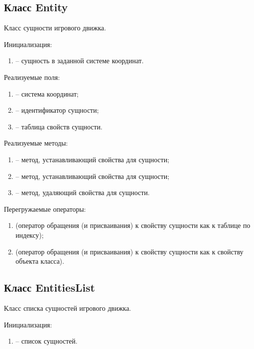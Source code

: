 \subsection{Класс Entity}
	\noindent Класс сущности игрового движка.

	\noindent Инициализация:
	\begin{enumerate}
		\item {} -- сущность в заданной системе координат.
	\end{enumerate}

	\noindent Реализуемые поля:
	\begin{enumerate}
		\item {} -- система координат;
		\item {} -- идентификатор сущности;
		\item {} -- таблица свойств сущности.
	\end{enumerate}

	\noindent Реализуемые методы:
	\begin{enumerate}
		\item {} -- метод, устанавливающий свойства для сущности;
		\item {} -- метод, устанавливающий свойства для сущности;
		\item {} -- метод, удаляющий свойства для сущности.
	\end{enumerate}

	\noindent Перегружаемые операторы:
	\begin{enumerate}
		\item {} (оператор обращения (и присваивания) к свойству сущности как к таблице по индексу);
		\item {} (оператор обращения (и присваивания) к свойству сущности как к свойству объекта класса).
	\end{enumerate}

\subsection{Класс EntitiesList}
	\noindent Класс списка сущностей игрового движка.

	\noindent Инициализация:
	\begin{enumerate}
		\item {} -- список сущностей.
	\end{enumerate}

